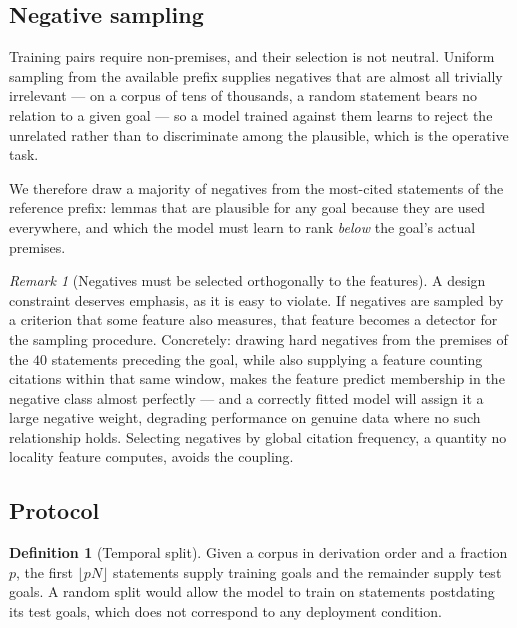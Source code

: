 \documentclass[11pt]{article}
\theoremstyle{plain}
\theoremstyle{definition}
\newtheorem{definition}[theorem]{Definition}
\theoremstyle{remark}
\newtheorem{remark}[theorem]{Remark}
\begin{document}
\subsection{Negative sampling}\label{sec:negatives}

Training pairs require non-premises, and their selection is not neutral. Uniform
sampling from the available prefix supplies negatives that are almost all
trivially irrelevant --- on a corpus of tens of thousands, a random statement
bears no relation to a given goal --- so a model trained against them learns to
reject the unrelated rather than to discriminate among the plausible, which is
the operative task.

We therefore draw a majority of negatives from the most-cited statements of the
reference prefix: lemmas that are plausible for any goal because they are used
everywhere, and which the model must learn to rank \emph{below} the goal's actual
premises.

\begin{remark}[Negatives must be selected orthogonally to the features]\label{rem:orthogonal}
A design constraint deserves emphasis, as it is easy to violate. If negatives are
sampled by a criterion that some feature also measures, that feature becomes a
detector for the sampling procedure. Concretely: drawing hard negatives from the
premises of the $40$ statements preceding the goal, while also supplying a
feature counting citations within that same window, makes the feature predict
membership in the negative class almost perfectly --- and a correctly fitted
model will assign it a large negative weight, degrading performance on genuine
data where no such relationship holds. Selecting negatives by global citation
frequency, a quantity no locality feature computes, avoids the coupling.
\end{remark}

\subsection{Protocol}\label{sec:protocol}

\begin{definition}[Temporal split]\label{def:split}
Given a corpus in derivation order and a fraction $p$, the first $\lfloor pN\rfloor$
statements supply training goals and the remainder supply test goals. A random
split would allow the model to train on statements postdating its test goals,
which does not correspond to any deployment condition.
\end{definition}
\end{document}
